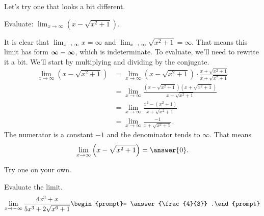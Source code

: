 \documentclass{ximera}
\begin{document}
Let's try one that looks a bit different.
\begin{example}
	Evaluate: $\displaystyle \lim_{x\to\infty} \left(x - \sqrt{x^2+1} \right)$.
	\begin{explanation}
		It is clear that $\lim_{x\to\infty}x = \infty$ and $\lim_{x\to\infty} \sqrt{x^2+1} = \infty$.  That means this limit has form $\small\boldsymbol{\infty - \infty}$, which is indeterminate.  To evaluate,
		we'll need to rewrite it a bit.  We'll start by multiplying and dividing by the conjugate.
		\begin{align*}
			\lim_{x\to\infty}\left(x - \sqrt{x^2+1}\right) &= \lim_{x\to\infty}\left(x - \sqrt{x^2+1}\right) \cdot \frac{x + \sqrt{x^2+1}}{x+\sqrt{x^2+1}}\\
				&= \lim_{x\to\infty} \frac{\left(x-\sqrt{x^2+1}\right)\left(x+\sqrt{x^2+1}\right)}{x+\sqrt{x^2+1}}\\
				&= \lim_{x\to\infty}\frac{x^2 - \left(x^2+1\right)}{x+\sqrt{x^2+1}}\\
				&= \lim_{x\to\infty}\frac{-1}{x + \sqrt{x^2+1}}.
		\end{align*}
		The numerator is a constant $-1$ and the denominator tends to $\infty$.  That means
		\[ \lim_{x\to\infty} \left( x - \sqrt{x^2+1} \right) = \answer{0}. \]
	\end{explanation}	
\end{example}

Try one on your own.
\begin{problem}
	Evaluate the limit.
	\[  \lim_{x\to -\infty} \frac{4x^3+x}{5x^3+2\sqrt{x^6 + 1}} \begin{prompt}= \answer{\frac{4}{3}} .\end{prompt}\]
\end{problem}
\end{document}
